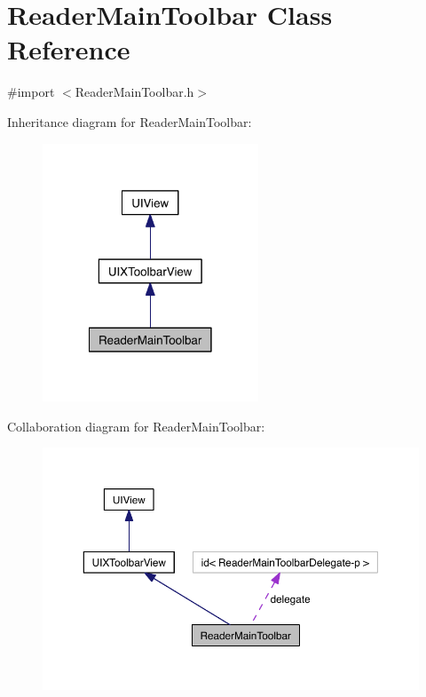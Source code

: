 \hypertarget{interface_reader_main_toolbar}{\section{Reader\-Main\-Toolbar Class Reference}
\label{dd/dd4/interface_reader_main_toolbar}
}


{\ttfamily \#import $<$Reader\-Main\-Toolbar.\-h$>$}



Inheritance diagram for Reader\-Main\-Toolbar\-:
\nopagebreak
\begin{figure}[H]
\begin{center}
\leavevmode
\includegraphics[width=182pt]{dd/d28/interface_reader_main_toolbar__inherit__graph}
\end{center}
\end{figure}


Collaboration diagram for Reader\-Main\-Toolbar\-:
\nopagebreak
\begin{figure}[H]
\begin{center}
\leavevmode
\includegraphics[width=350pt]{d4/deb/interface_reader_main_toolbar__coll__graph}
\end{center}
\end{figure}
